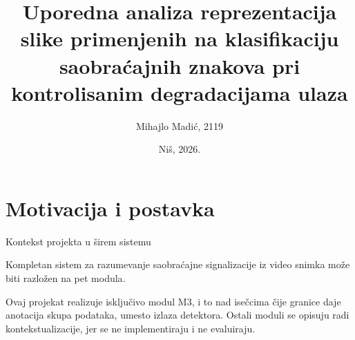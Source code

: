 \documentclass[aspectratio=169, 10pt]{beamer}
\title{Uporedna analiza reprezentacija slike primenjenih na klasifikaciju saobraćajnih znakova pri kontrolisanim degradacijama ulaza}
\author{Mihajlo Madić, 2119}
\institute{Univerzitet u Nišu, Elektronski fakultet \\ Projekat iz predmeta Računarski vid}
\date{Niš, 2026.}
\begin{document}
\maketitle

\section{Motivacija i postavka}

\begin{frame}{Kontekst projekta u širem sistemu}

Kompletan sistem za razumevanje saobraćajne signalizacije iz video snimka može biti razložen na
\alert{pet modula}.

\vspace{0.35cm}
\begin{center}
\end{center}

\vspace{0.15cm}
\small
Ovaj projekat realizuje \alert{isključivo modul M3}, i to nad isečcima čije granice daje
anotacija skupa podataka, umesto izlaza detektora. Ostali moduli se opisuju radi
kontekstualizacije, jer se ne implementiraju i ne evaluiraju.

\end{frame}
\end{document}
